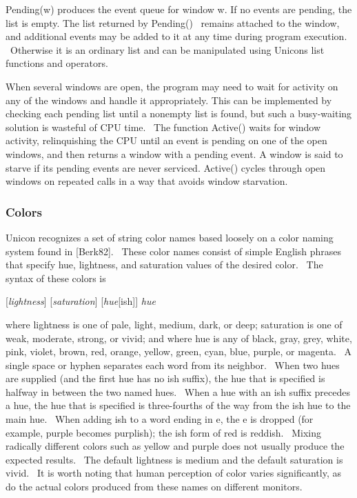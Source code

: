 Pending(w) produces the event queue for window w. If no events are
pending, the list is empty. The list returned by Pending() \ remains
attached to the window, and additional events may be added to it at any
time during program execution. \ Otherwise it is an ordinary list and
can be manipulated using Unicon{\textquotesingle}s list functions and
operators.

When several windows are open, the program may need to wait for activity
on any of the windows and handle it appropriately. This can be
implemented by checking each pending list until a nonempty list is
found, but such a busy-waiting solution is wasteful of CPU time. \ The
function Active() waits for window activity, relinquishing the CPU
until an event is pending on one of the open windows, and then returns
a window with a pending event. A window is said to starve if its
pending events are never serviced. Active() cycles through open windows
on repeated calls in a way that avoids window starvation.

\subsubsection{Colors}

Unicon recognizes a set of string color names based loosely on a color
naming system found in [Berk82]. \ These color names consist of simple
English phrases that specify hue, lightness, and saturation values of
the desired color. \ The syntax of these colors is

[\textit{lightness}] [\textit{saturation}] [\textit{hue}[ish]]
\textit{hue}

where lightness is one of pale, light, medium, dark, or deep; saturation
is one of weak, moderate, strong, or vivid; and where hue is any of
black, gray, grey, white, pink, violet, brown, red, orange, yellow,
green, cyan, blue, purple, or magenta. \ A single space or hyphen
separates each word from its neighbor. \ When two hues are supplied
(and the first hue has no ish suffix), the hue that is specified is
halfway in between the two named hues. \ When a hue with an ish suffix
precedes a hue, the hue that is specified is three-fourths of the way
from the ish hue to the main hue. \ When adding ish to a word ending in
e, the e is dropped (for example, purple becomes purplish); the ish
form of red is reddish. \ Mixing radically different colors such as
yellow and purple does not usually produce the expected results. \ The
default lightness is medium and the default saturation is vivid. \ It
is worth noting that human perception of color varies significantly, as
do the actual colors produced from these names on different monitors.

